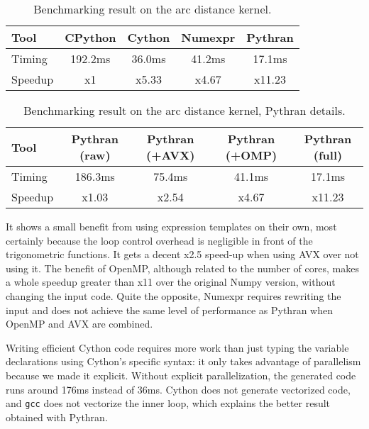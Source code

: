 \documentclass[10pt, onecolumn, preprint]{sigplanconf}
\begin{document}
\begin{table}
    \centering
    \begin{tabular}{|l|c|c|c|c|}
    \hline
     Tool    &  CPython    &  Cython  &  Numexpr    & Pythran   \\
    \hline
     Timing  &  192.2ms    &  36.0ms  &    41.2ms   &  17.1ms   \\
    \hline
     Speedup &  x1         &  x5.33   &  x4.67      &  x11.23   \\
    \hline
\end{tabular}
\caption{Benchmarking result on the arc distance kernel.}
\label{tbl:arc-distance}
\end{table}

\begin{table}
    \centering
    \begin{tabular}{|l|c|c|c|c|}
    \hline
    Tool & Pythran (raw) & Pythran (+AVX) & Pythran (+OMP) & Pythran (full)  \\
    \hline
    Timing & 186.3ms     &    75.4ms      &    41.1ms      &  17.1ms         \\
    \hline
    Speedup&    x1.03      &    x2.54       &    x4.67       &  x11.23         \\
    \hline
\end{tabular}
\caption{Benchmarking result on the arc distance kernel, Pythran details.}
\label{tbl:arc-distance-2}
\end{table}

It shows a small benefit from using expression templates on their own, most
certainly because the loop control overhead is negligible in front of the
trigonometric functions. It gets a decent x2.5 speed-up when using AVX over not
using it. The benefit of OpenMP, although related to the number of cores, makes
a whole speedup greater than x11 over the original Numpy version, without
changing the input code. Quite the opposite, Numexpr requires rewriting the input
and does not achieve the same level of performance as Pythran when OpenMP and
AVX are combined.

Writing efficient Cython code requires more work than just typing the variable
declarations using Cython's specific syntax: it only takes advantage of
parallelism because we made it explicit. Without explicit parallelization,
the generated code runs around 176ms instead of 36ms. Cython does not generate
vectorized code, and \texttt{gcc} does not vectorize the inner loop, which explains
the better result obtained with Pythran.
\end{document}
